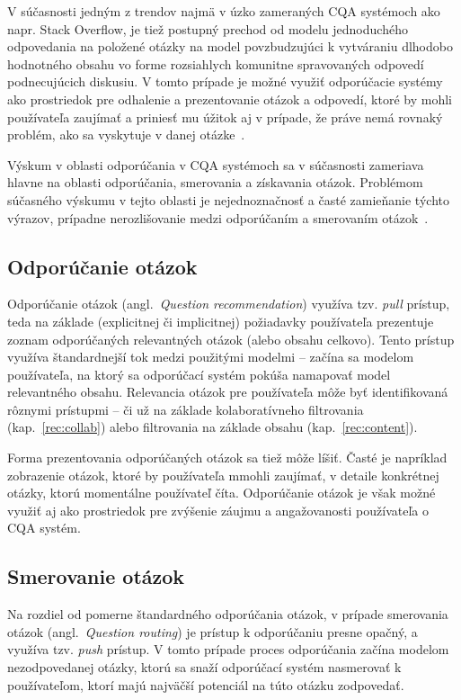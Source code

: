 V súčasnosti jedným z trendov najmä v úzko zameraných CQA systémoch ako napr. Stack Overflow, je tiež postupný prechod
od modelu jednoduchého odpovedania na položené otázky na model povzbudzujúci k vytváraniu dlhodobo hodnotného obsahu
vo forme rozsiahlych komunitne spravovaných odpovedí~\cite{Anderson2012,Li2015} podnecujúcich diskusiu.
V tomto prípade je možné využiť odporúčacie systémy ako prostriedok pre odhalenie a prezentovanie otázok a odpovedí,
ktoré by mohli používateľa zaujímať a priniesť mu úžitok aj v prípade, že práve nemá rovnaký problém,
ako sa vyskytuje v danej otázke~\cite{Toba2014}.

Výskum v oblasti odporúčania v CQA systémoch sa v súčasnosti zameriava hlavne na oblasti odporúčania, smerovania
a získavania otázok. Problémom súčasného výskumu v tejto oblasti je nejednoznačnosť a časté zamieňanie týchto výrazov,
prípadne nerozlišovanie medzi odporúčaním a smerovaním otázok~\cite{Srba2016}.

\subsection{Odporúčanie otázok}\label{q:rec}

Odporúčanie otázok (angl.~\emph{Question recommendation}) využíva tzv. \emph{pull} prístup, teda na základe (explicitnej
či implicitnej) požiadavky používateľa prezentuje zoznam odporúčaných relevantných otázok (alebo obsahu celkovo).
Tento prístup využíva štandardnejší tok medzi použitými modelmi -- začína sa modelom používateľa, na ktorý sa odporúčací
systém pokúša namapovať model relevantného obsahu.
Relevancia otázok pre používateľa môže byť identifikovaná rôznymi prístupmi -- či už na základe kolaboratívneho
filtrovania (kap.~\ref{rec:collab}) alebo filtrovania na základe obsahu (kap.~\ref{rec:content}).

Forma prezentovania odporúčaných otázok sa tiež môže líšiť. Časté je napríklad zobrazenie otázok, ktoré by používateľa
mmohli zaujímať, v detaile konkrétnej otázky, ktorú momentálne používateľ číta. Odporúčanie otázok je však možné využiť
aj ako prostriedok pre zvýšenie záujmu a angažovanosti používateľa o CQA systém.


\subsection{Smerovanie otázok}\label{q:routing}

Na rozdiel od pomerne štandardného odporúčania otázok, v prípade smerovania otázok (angl.~\emph{Question routing})
je prístup k odporúčaniu presne opačný, a využíva tzv. \emph{push} prístup. V tomto prípade proces odporúčania začína
modelom nezodpovedanej otázky, ktorú sa snaží odporúčací systém nasmerovať k používateľom, ktorí majú najväčší potenciál
na túto otázku zodpovedať.

